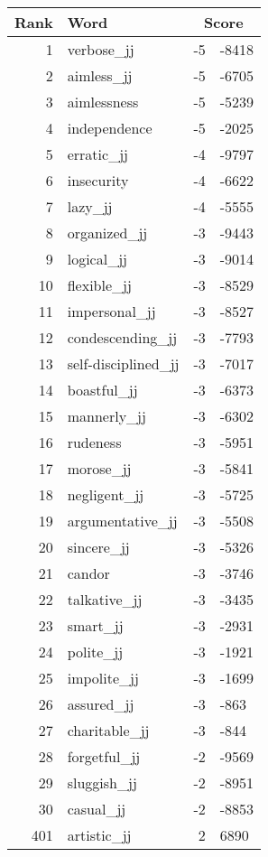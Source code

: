 \begin{longtable}[!htbp]{| rlr@{.}l |}
    \hline
    \textbf{Rank} & \textbf{Word} & \multicolumn{2}{c|}{\textbf{Score}} \\
    \hline
    \endhead
    1 & verbose\_jj & -5 & -8418 \\
    2 & aimless\_jj & -5 & -6705 \\
    3 & aimlessness & -5 & -5239 \\
    4 & independence & -5 & -2025 \\
    5 & erratic\_jj & -4 & -9797 \\
    6 & insecurity & -4 & -6622 \\
    7 & lazy\_jj & -4 & -5555 \\
    8 & organized\_jj & -3 & -9443 \\
    9 & logical\_jj & -3 & -9014 \\
    10 & flexible\_jj & -3 & -8529 \\
    11 & impersonal\_jj & -3 & -8527 \\
    12 & condescending\_jj & -3 & -7793 \\
    13 & self-disciplined\_jj & -3 & -7017 \\
    14 & boastful\_jj & -3 & -6373 \\
    15 & mannerly\_jj & -3 & -6302 \\
    16 & rudeness & -3 & -5951 \\
    17 & morose\_jj & -3 & -5841 \\
    18 & negligent\_jj & -3 & -5725 \\
    19 & argumentative\_jj & -3 & -5508 \\
    20 & sincere\_jj & -3 & -5326 \\
    21 & candor & -3 & -3746 \\
    22 & talkative\_jj & -3 & -3435 \\
    23 & smart\_jj & -3 & -2931 \\
    24 & polite\_jj & -3 & -1921 \\
    25 & impolite\_jj & -3 & -1699 \\
    26 & assured\_jj & -3 & -863 \\
    27 & charitable\_jj & -3 & -844 \\
    28 & forgetful\_jj & -2 & -9569 \\
    29 & sluggish\_jj & -2 & -8951 \\
    30 & casual\_jj & -2 & -8853 \\
    401 & artistic\_jj & 2 & 6890 \\

\end{longtable}
